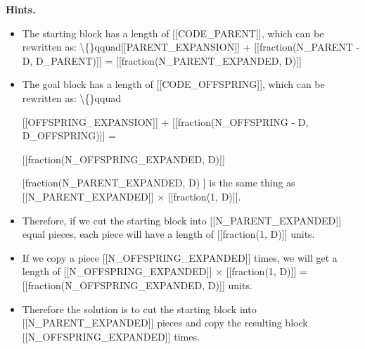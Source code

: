 \documentclass{article}
\begin{document}
\textbf{Hints.}
\begin{itemize}
  \item The starting block has a length of [[CODE\_PARENT]], which can be rewritten as:
                        \textbackslash\{\}qquad[[PARENT\_EXPANSION]]
                             + [[fraction(N\_PARENT - D, D\_PARENT)]] = 
                            [[fraction(N\_PARENT\_EXPANDED, D)]]
  \item The goal block has a length of [[CODE\_OFFSPRING]], which can be rewritten as:
                        \textbackslash\{\}qquad
                            
                                [[OFFSPRING\_EXPANSION]]
                                 + [[fraction(N\_OFFSPRING - D, D\_OFFSPRING)]] = 
                            
                            [[fraction(N\_OFFSPRING\_EXPANDED, D)]]
  \item [[fraction(N\_PARENT\_EXPANDED, D)]] is the same thing as
                        [[N\_PARENT\_EXPANDED]] $\times$ [[fraction(1, D)]].
  \item Therefore, if we cut the starting block into [[N\_PARENT\_EXPANDED]] equal pieces,
                        each piece will have a length of [[fraction(1, D)]] units.
  \item If we copy a piece [[N\_OFFSPRING\_EXPANDED]] times, we will get a length of
                        [[N\_OFFSPRING\_EXPANDED]] $\times$ [[fraction(1, D)]] = [[fraction(N\_OFFSPRING\_EXPANDED, D)]] units.
  \item Therefore the solution is to cut the starting block into [[N\_PARENT\_EXPANDED]] pieces
                        and copy the resulting block [[N\_OFFSPRING\_EXPANDED]] times.
\end{itemize}
\end{document}
